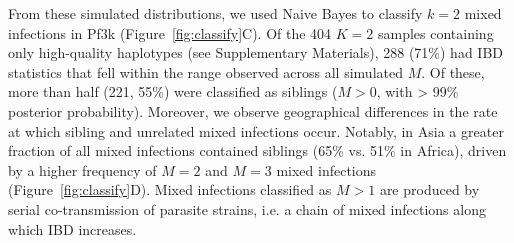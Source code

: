 \documentclass[9pt,lineno]{elife}
\begin{document}
From these simulated distributions, we used Naive Bayes to classify $k=2$ mixed infections in Pf3k (Figure~\ref{fig:classify}C).  Of the 404  $K = 2$ samples containing only high-quality haplotypes (see Supplementary Materials), 288 (71\%) had IBD statistics that fell within the range observed across all simulated $M$. Of these, more than half (221, 55\%) were classified as siblings ($M > 0$, with > 99\% posterior probability).  Moreover, we observe geographical differences in the rate at which sibling and unrelated mixed infections occur. Notably, in Asia a greater fraction of all mixed infections contained siblings (65\% vs. 51\% in Africa), driven by a higher frequency of $M=2$ and $M=3$ mixed infections (Figure~\ref{fig:classify}D).  Mixed infections classified as $M>1$ are produced by serial co-transmission of  parasite strains, i.e. a chain of mixed infections along which IBD increases.
\end{document}
